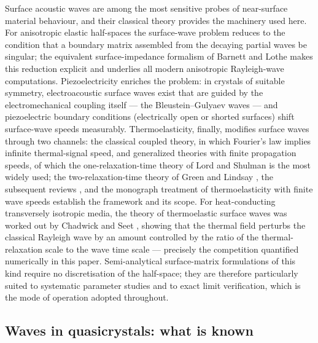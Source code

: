 \documentclass[11pt]{article}
\begin{document}
Surface acoustic waves are among the most sensitive probes of near-surface material behaviour, and their classical theory provides the machinery used here. For anisotropic elastic half-spaces the surface-wave problem reduces to the condition that a boundary matrix assembled from the decaying partial waves be singular; the equivalent surface-impedance formalism of Barnett and Lothe \cite{barnett1985} makes this reduction explicit and underlies all modern anisotropic Rayleigh-wave computations. Piezoelectricity enriches the problem: in crystals of suitable symmetry, electroacoustic surface waves exist that are guided by the electromechanical coupling itself --- the Bleustein--Gulyaev waves \cite{bleustein1968,gulyaev1969} --- and piezoelectric boundary conditions (electrically open or shorted surfaces) shift surface-wave speeds measurably. Thermoelasticity, finally, modifies surface waves through two channels: the classical coupled theory, in which Fourier's law implies infinite thermal-signal speed, and generalized theories with finite propagation speeds, of which the one-relaxation-time theory of Lord and Shulman \cite{lord1967} is the most widely used; the two-relaxation-time theory of Green and Lindsay \cite{green1972}, the subsequent reviews \cite{chandrasekharaiah1986,chandrasekharaiah1998}, and the monograph treatment of thermoelasticity with finite wave speeds \cite{ignatzak2009} establish the framework and its scope. For heat-conducting transversely isotropic media, the theory of thermoelastic surface waves was worked out by Chadwick and Seet \cite{chadwick1970}, showing that the thermal field perturbs the classical Rayleigh wave by an amount controlled by the ratio of the thermal-relaxation scale to the wave time scale --- precisely the competition quantified numerically in this paper. Semi-analytical surface-matrix formulations of this kind require no discretisation of the half-space; they are therefore particularly suited to systematic parameter studies and to exact limit verification, which is the mode of operation adopted throughout.

\subsection{Waves in quasicrystals: what is known}
\end{document}
